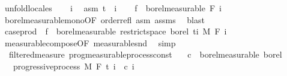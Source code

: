 \begin{isabellebody}
%
\isadelimproof
%
\endisadelimproof
%
\isatagproof
{}\isamarkupfalse%
\ {\isacharparenleft}{\kern0pt}unfold{\isacharunderscore}{\kern0pt}locales{\isacharparenright}{\kern0pt}\isanewline
\ \ \isamarkupfalse%
\ i\ \isamarkupfalse%
\ asm{\isacharcolon}{\kern0pt}\ {\isachardoublequoteopen}t\ {\isasymle}\ i{\isachardoublequoteclose}\isanewline
\ \ \isamarkupfalse%
\ {\isachardoublequoteopen}f\ {\isasymin}\ borel{\isacharunderscore}{\kern0pt}measurable\ {\isacharparenleft}{\kern0pt}F\ i{\isacharparenright}{\kern0pt}{\isachardoublequoteclose}\ \isamarkupfalse%
\ borel{\isacharunderscore}{\kern0pt}measurable{\isacharunderscore}{\kern0pt}mono{\isacharbrackleft}{\kern0pt}OF\ order{\isachardot}{\kern0pt}refl\ asm{\isacharbrackright}{\kern0pt}\ assms\ \isamarkupfalse%
\ blast\isanewline
\ \ \isamarkupfalse%
\ {\isachardoublequoteopen}case{\isacharunderscore}{\kern0pt}prod\ {\isacharparenleft}{\kern0pt}{\isasymlambda}{\isacharunderscore}{\kern0pt}{\isachardot}{\kern0pt}\ f{\isacharparenright}{\kern0pt}\ {\isasymin}\ borel{\isacharunderscore}{\kern0pt}measurable\ {\isacharparenleft}{\kern0pt}restrict{\isacharunderscore}{\kern0pt}space\ borel\ {\isacharbraceleft}{\kern0pt}ti{\isacharbraceright}{\kern0pt}\ {\isasymOtimes}\isactrlsub M\ F\ i{\isacharparenright}{\kern0pt}{\isachardoublequoteclose}\ \isamarkupfalse%
\ measurable{\isacharunderscore}{\kern0pt}compose{\isacharbrackleft}{\kern0pt}OF\ measurable{\isacharunderscore}{\kern0pt}snd{\isacharbrackright}{\kern0pt}\ \isamarkupfalse%
\ simp\isanewline
{}\isamarkupfalse%
%
\endisatagproof
{\isafoldproof}%
%
\isadelimproof
\isanewline
%
\endisadelimproof
\isanewline
{}\isamarkupfalse%
\ {\isacharparenleft}{\kern0pt}\ filtered{\isacharunderscore}{\kern0pt}measure{\isacharparenright}{\kern0pt}\ prog{\isacharunderscore}{\kern0pt}measurable{\isacharunderscore}{\kern0pt}process{\isacharunderscore}{\kern0pt}const{\isacharcolon}{\kern0pt}\isanewline
\ \ \ {\isachardoublequoteopen}c\ {\isasymin}\ borel{\isacharunderscore}{\kern0pt}measurable\ borel{\isachardoublequoteclose}\isanewline
\ \ \ {\isachardoublequoteopen}progressive{\isacharunderscore}{\kern0pt}process\ M\ F\ t\ {\isacharparenleft}{\kern0pt}{\isasymlambda}i\ {\isacharunderscore}{\kern0pt}{\isachardot}{\kern0pt}\ c\ i{\isacharparenright}{\kern0pt}{\isachardoublequoteclose}\isanewline

\end{isabellebody}
